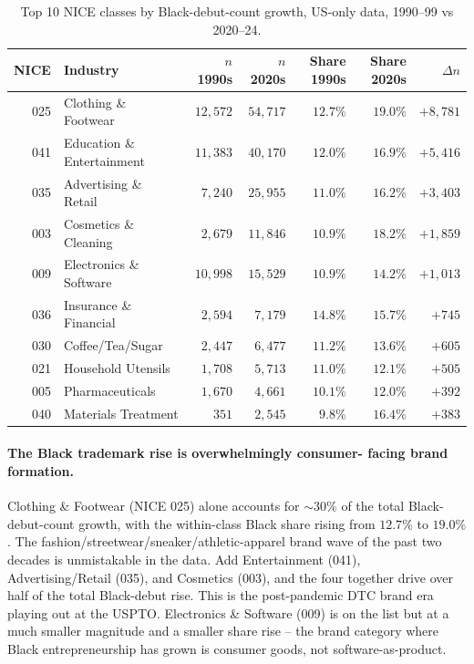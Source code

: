 \documentclass[11pt]{article}
\begin{document}
\begin{table}[h]
\centering
\small
\begin{tabular}{rlrrrrr}
\toprule
NICE & Industry & $n$ 1990s & $n$ 2020s & Share 1990s & Share 2020s & $\Delta n$ \\
\midrule
025 & Clothing \& Footwear        & $12{,}572$ & $54{,}717$ & $12.7\%$ & $19.0\%$ & $+8{,}781$ \\
041 & Education \& Entertainment  & $11{,}383$ & $40{,}170$ & $12.0\%$ & $16.9\%$ & $+5{,}416$ \\
035 & Advertising \& Retail       & $7{,}240$  & $25{,}955$ & $11.0\%$ & $16.2\%$ & $+3{,}403$ \\
003 & Cosmetics \& Cleaning       & $2{,}679$  & $11{,}846$ & $10.9\%$ & $18.2\%$ & $+1{,}859$ \\
009 & Electronics \& Software     & $10{,}998$ & $15{,}529$ & $10.9\%$ & $14.2\%$ & $+1{,}013$ \\
036 & Insurance \& Financial      & $2{,}594$  &  $7{,}179$ & $14.8\%$ & $15.7\%$ &   $+745$ \\
030 & Coffee/Tea/Sugar            & $2{,}447$  &  $6{,}477$ & $11.2\%$ & $13.6\%$ &   $+605$ \\
021 & Household Utensils          & $1{,}708$  &  $5{,}713$ & $11.0\%$ & $12.1\%$ &   $+505$ \\
005 & Pharmaceuticals             & $1{,}670$  &  $4{,}661$ & $10.1\%$ & $12.0\%$ &   $+392$ \\
040 & Materials Treatment         &    $351$   &  $2{,}545$ &  $9.8\%$ & $16.4\%$ &   $+383$ \\
\bottomrule
\end{tabular}
\caption{Top 10 NICE classes by Black-debut-count growth, US-only
data, 1990--99 vs 2020--24.}
\end{table}

\paragraph{The Black trademark rise is overwhelmingly consumer-
facing brand formation.} Clothing \& Footwear (NICE 025) alone
accounts for $\sim 30\%$ of the total Black-debut-count growth,
with the within-class Black share rising from $12.7\%$ to
$19.0\%$. The fashion/streetwear/sneaker/athletic-apparel brand
wave of the past two decades is unmistakable in the data. Add
Entertainment (041), Advertising/Retail (035), and Cosmetics (003),
and the four together drive over half of the total Black-debut
rise. This is the post-pandemic DTC brand era playing out at the
USPTO. Electronics \& Software (009) is on the list but at a much
smaller magnitude and a smaller share rise -- the brand category
where Black entrepreneurship has grown is consumer goods, not
software-as-product.
\end{document}
